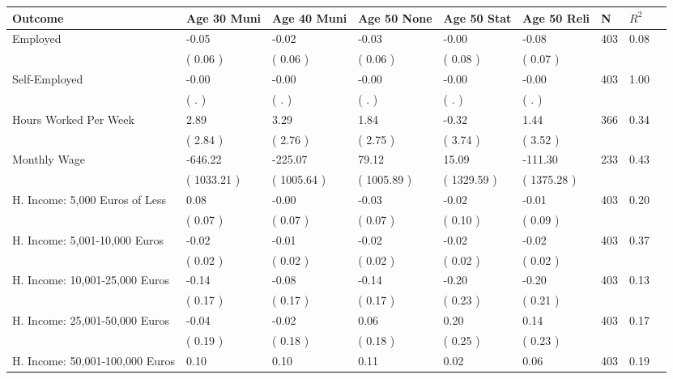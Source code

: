 \begin{tabular}{L{6.2cm} C{1.8cm} C{1.8cm} C{1.8cm} C{1.8cm} C{1.8cm} C{1.8cm} C{0.3cm} C{0.3cm}}
\toprule
 \textbf{Outcome} & \textbf{Age 30 Muni} & \textbf{Age 40 Muni} & \textbf{Age 50 None} & \textbf{Age 50 Stat} & \textbf{Age 50 Reli} & \textbf{N} & \textbf{$ R^2$} \\
\midrule
Employed &     -0.05 &     -0.02 &     -0.03 &     -0.00 &     -0.08  & 403 &       0.08 \\ 
 & (     0.06 ) & (     0.06 ) & (     0.06 ) & (     0.08 ) & (     0.07 )  & \\
Self-Employed &     -0.00 &     -0.00 &     -0.00 &     -0.00 &     -0.00  & 403 &       1.00 \\ 
 & (        . ) & (        . ) & (        . ) & (        . ) & (        . )  & \\
Hours Worked Per Week &      2.89 &      3.29 &      1.84 &     -0.32 &      1.44  & 366 &       0.34 \\ 
 & (     2.84 ) & (     2.76 ) & (     2.75 ) & (     3.74 ) & (     3.52 )  & \\
Monthly Wage &   -646.22 &   -225.07 &     79.12 &     15.09 &   -111.30  & 233 &       0.43 \\ 
 & (  1033.21 ) & (  1005.64 ) & (  1005.89 ) & (  1329.59 ) & (  1375.28 )  & \\
H. Income: 5,000 Euros of Less &      0.08 &     -0.00 &     -0.03 &     -0.02 &     -0.01  & 403 &       0.20 \\ 
 & (     0.07 ) & (     0.07 ) & (     0.07 ) & (     0.10 ) & (     0.09 )  & \\
H. Income: 5,001-10,000 Euros &     -0.02 &     -0.01 &     -0.02 &     -0.02 &     -0.02  & 403 &       0.37 \\ 
 & (     0.02 ) & (     0.02 ) & (     0.02 ) & (     0.02 ) & (     0.02 )  & \\
H. Income: 10,001-25,000 Euros &     -0.14 &     -0.08 &     -0.14 &     -0.20 &     -0.20  & 403 &       0.13 \\ 
 & (     0.17 ) & (     0.17 ) & (     0.17 ) & (     0.23 ) & (     0.21 )  & \\
H. Income: 25,001-50,000 Euros &     -0.04 &     -0.02 &      0.06 &      0.20 &      0.14  & 403 &       0.17 \\ 
 & (     0.19 ) & (     0.18 ) & (     0.18 ) & (     0.25 ) & (     0.23 )  & \\
H. Income: 50,001-100,000 Euros &      0.10 &      0.10 &      0.11 &      0.02 &      0.06  & 403 &       0.19 \\ 

\end{tabular}
